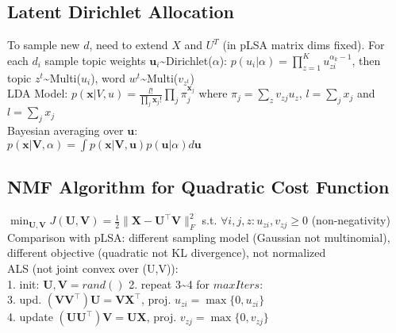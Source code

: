 \subsection*{Latent Dirichlet Allocation}
To sample new $d$, need to extend $X$ and $U^T$ (in pLSA matrix dims fixed). For each $d_i$ sample topic weights $\mathbf{u}_i$\textasciitilde Dirichlet($\alpha$): $p(u_i|\alpha) = \prod_{z=1}^K u_{zi}^{\alpha_k-1}$, then topic $z^t$\textasciitilde Multi($u_i$), word $w^t$\textasciitilde Multi($v_{z^t}$)\\
LDA Model: $p(\mathbf{x}|V,u) = \frac{l!}{\prod_j \mathbf{x}_j!}\prod_j \pi_j^{\mathbf{x}_j}$ 
where $\pi_j=\sum_z v_{zj} u_z$, $l=\sum_j x_j$ and $l = \sum_j x_j$\\
Bayesian averaging over $\mathbf{u}$: \\
$p(\mathbf{x}|\mathbf{V},\alpha)=\int p(\mathbf{x}|\mathbf{V},\mathbf{u})p(\mathbf{u}|\alpha)d\mathbf{u}$
\subsection*{NMF Algorithm for Quadratic Cost Function}
$\min_{\mathbf{U}, \mathbf{V}} J(\mathbf{U}, \mathbf{V}) = \frac{1}{2} \|\mathbf{X} - \mathbf{U}^\top\mathbf{V}\|_F^2$
s.t. $\forall i,j,z:u_{zi},v_{zj} \geq 0 $ (non-negativity)\\
Comparison with pLSA: different sampling model (Gaussian not multinomial), different objective (quadratic not KL divergence), not normalized \\
ALS (not joint convex over (U,V)):\\
1. init: $\mathbf{U}, \mathbf{V} = rand()$ 2. repeat 3\textasciitilde4 for $\mathit{maxIters}$:\\
3. upd. $(\mathbf{VV}^\top)\mathbf{U} = \mathbf{VX}^\top$, proj. $u_{zi} = \max \{ 0, u_{zi} \}$\\
4. update $(\mathbf{UU}^\top)\mathbf{V} = \mathbf{UX}$, proj. $v_{zj} = \max \{ 0, v_{zj} \}$
